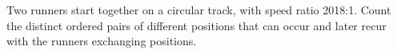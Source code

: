 Two runners start together on a circular track, with speed ratio 2018:1. Count the distinct ordered pairs of different positions that can occur and later recur with the runners exchanging positions.

